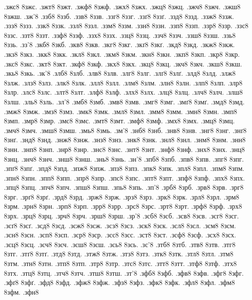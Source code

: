 {.зжс8
8зжс.
.зжт8
8зжт.
.зжф8
8зжф.
.зжх8
8зжх.
.зжц8
8зжц.
.зжч8
8зжч.
.зжш8
8зжш.
.зж'8
.ззб8
8ззб.
.ззв8
8ззв.
.ззг8
8ззг.
.ззґ8
8ззґ.
.ззд8
8ззд.
.ззж8
8ззж.
.ззз8
8ззз.
.ззк8
8ззк.
.ззл8
8ззл.
.ззм8
8ззм.
.ззн8
8ззн.
.ззп8
8ззп.
.ззр8
8ззр.
.ззс8
8ззс.
.ззт8
8ззт.
.ззф8
8ззф.
.ззх8
8ззх.
.ззц8
8ззц.
.ззч8
8ззч.
.ззш8
8ззш.
.ззь8
8ззь.
.зз'8
.зкб8
8зкб.
.зкв8
8зкв.
.зкг8
8зкг.
.зкґ8
8зкґ.
.зкд8
8зкд.
.зкж8
8зкж.
.зкз8
8зкз.
.зкк8
8зкк.
.зкл8
8зкл.
.зкм8
8зкм.
.зкн8
8зкн.
.зкп8
8зкп.
.зкр8
8зкр.
.зкс8
8зкс.
.зкт8
8зкт.
.зкф8
8зкф.
.зкх8
8зкх.
.зкц8
8зкц.
.зкч8
8зкч.
.зкш8
8зкш.
.зкь8
8зкь.
.зк'8
.злб8
8злб.
.злв8
8злв.
.злг8
8злг.
.злґ8
8злґ.
.злд8
8злд.
.злж8
8злж.
.злз8
8злз.
.злк8
8злк.
.злл8
8злл.
.злм8
8злм.
.злн8
8злн.
.злп8
8злп.
.злр8
8злр.
.злс8
8злс.
.злт8
8злт.
.злф8
8злф.
.злх8
8злх.
.злц8
8злц.
.злч8
8злч.
.злш8
8злш.
.зль8
8зль.
.зл'8
.змб8
8змб.
.змв8
8змв.
.змг8
8змг.
.змґ8
8змґ.
.змд8
8змд.
.змж8
8змж.
.змз8
8змз.
.змк8
8змк.
.змл8
8змл.
.змм8
8змм.
.змн8
8змн.
.змп8
8змп.
.змр8
8змр.
.змс8
8змс.
.змт8
8змт.
.змф8
8змф.
.змх8
8змх.
.змц8
8змц.
.змч8
8змч.
.змш8
8змш.
.змь8
8змь.
.зм'8
.знб8
8знб.
.знв8
8знв.
.знг8
8знг.
.знґ8
8знґ.
.знд8
8знд.
.знж8
8знж.
.знз8
8знз.
.знк8
8знк.
.знл8
8знл.
.знм8
8знм.
.знн8
8знн.
.знп8
8знп.
.знр8
8знр.
.знс8
8знс.
.знт8
8знт.
.знф8
8знф.
.знх8
8знх.
.знц8
8знц.
.знч8
8знч.
.знш8
8знш.
.знь8
8знь.
.зн'8
.зпб8
8зпб.
.зпв8
8зпв.
.зпг8
8зпг.
.зпґ8
8зпґ.
.зпд8
8зпд.
.зпж8
8зпж.
.зпз8
8зпз.
.зпк8
8зпк.
.зпл8
8зпл.
.зпм8
8зпм.
.зпн8
8зпн.
.зпп8
8зпп.
.зпр8
8зпр.
.зпс8
8зпс.
.зпт8
8зпт.
.зпф8
8зпф.
.зпх8
8зпх.
.зпц8
8зпц.
.зпч8
8зпч.
.зпш8
8зпш.
.зпь8
8зпь.
.зп'8
.зрб8
8зрб.
.зрв8
8зрв.
.зрг8
8зрг.
.зрґ8
8зрґ.
.зрд8
8зрд.
.зрж8
8зрж.
.зрз8
8зрз.
.зрк8
8зрк.
.зрл8
8зрл.
.зрм8
8зрм.
.зрн8
8зрн.
.зрп8
8зрп.
.зрр8
8зрр.
.зрс8
8зрс.
.зрт8
8зрт.
.зрф8
8зрф.
.зрх8
8зрх.
.зрц8
8зрц.
.зрч8
8зрч.
.зрш8
8зрш.
.зр'8
.зсб8
8зсб.
.зсв8
8зсв.
.зсг8
8зсг.
.зсґ8
8зсґ.
.зсд8
8зсд.
.зсж8
8зсж.
.зсз8
8зсз.
.зск8
8зск.
.зсл8
8зсл.
.зсм8
8зсм.
.зсн8
8зсн.
.зсп8
8зсп.
.зср8
8зср.
.зсс8
8зсс.
.зст8
8зст.
.зсф8
8зсф.
.зсх8
8зсх.
.зсц8
8зсц.
.зсч8
8зсч.
.зсш8
8зсш.
.зсь8
8зсь.
.зс'8
.зтб8
8зтб.
.зтв8
8зтв.
.зтг8
8зтг.
.зтґ8
8зтґ.
.зтд8
8зтд.
.зтж8
8зтж.
.зтз8
8зтз.
.зтк8
8зтк.
.зтл8
8зтл.
.зтм8
8зтм.
.зтн8
8зтн.
.зтп8
8зтп.
.зтр8
8зтр.
.зтс8
8зтс.
.зтт8
8зтт.
.зтф8
8зтф.
.зтх8
8зтх.
.зтц8
8зтц.
.зтч8
8зтч.
.зтш8
8зтш.
.зт'8
.зфб8
8зфб.
.зфв8
8зфв.
.зфг8
8зфг.
.зфґ8
8зфґ.
.зфд8
8зфд.
.зфж8
8зфж.
.зфз8
8зфз.
.зфк8
8зфк.
.зфл8
8зфл.
.зфм8
8зфм.
.зфн8
}
